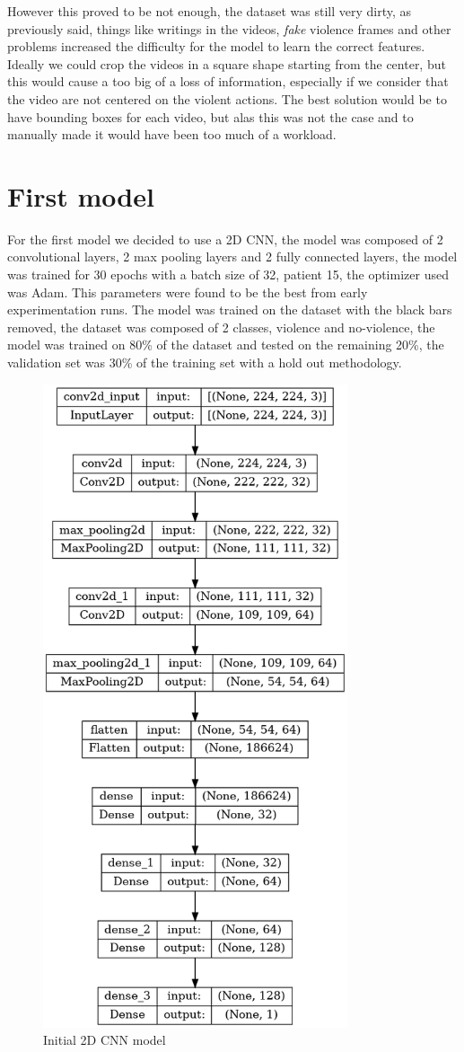 However this proved to be not enough, the dataset was still very dirty, as previously said, things like writings in the videos, \textit{fake} violence frames and other problems increased the difficulty for the model to learn the correct features. Ideally we could crop the videos in a square shape starting from the center, but this would cause a too big of a loss of information, especially if we consider that the video are not centered on the violent actions. The best solution would be to have bounding boxes for each video, but alas this was not the case and to manually made it would have been too much of a workload.

\section{First model}
For the first model we decided to use a 2D CNN, the model was composed of 2 convolutional layers, 2 max pooling layers and 2 fully connected layers, the model was trained for 30 epochs with a batch size of 32, patient 15, the optimizer used was Adam. This parameters were found to be the best from early experimentation runs. The model was trained on the dataset with the black bars removed, the dataset was composed of 2 classes, violence and no-violence, the model was trained on 80\% of the dataset and tested on the remaining 20\%, the validation set was 30\% of the training set with a hold out methodology.  

\begin{figure}[]
    \centering
    \includegraphics[width=0.8\textwidth, height=1.3\textwidth]{images/2D_3_noDrop.png}
    \caption{Initial 2D CNN model}
    \label{fig:First2DCNN}
\end{figure}

